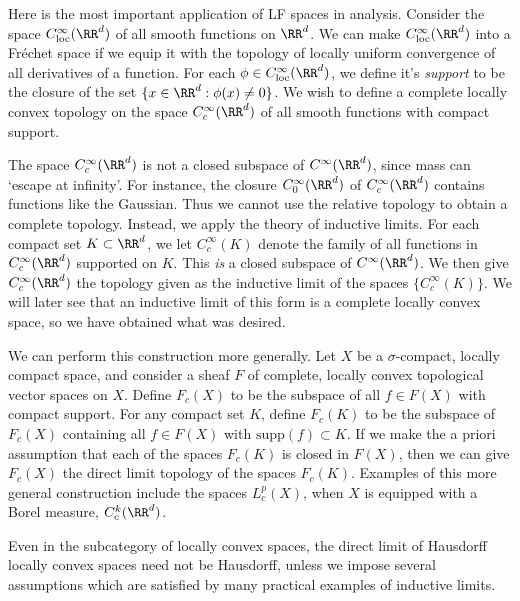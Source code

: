 \begin{example}
    Here is the most important application of LF spaces in analysis. Consider the space $C^\infty_{\text{loc}}(\RR^d)$ of all smooth functions on $\RR^d$. We can make $C^\infty_{\text{loc}}(\RR^d)$ into a Fr\'{e}chet space if we equip it with the topology of locally uniform convergence of all derivatives of a function. For each $\phi \in C^\infty_{\text{loc}}(\RR^d)$, we define it's \emph{support} to be the closure of the set $\{ x \in \RR^d: \phi(x) \neq 0 \}$. We wish to define a complete locally convex topology on the space $C_c^\infty(\RR^d)$ of all smooth functions with compact support.

    The space $C_c^\infty(\RR^d)$ is not a closed subspace of $C^\infty(\RR^d)$, since mass can `escape at infinity'. For instance, the closure $C_0^\infty(\RR^d)$ of $C_c^\infty(\RR^d)$ contains functions like the Gaussian. Thus we cannot use the relative topology to obtain a complete topology. Instead, we apply the theory of inductive limits. For each compact set $K \subset \RR^d$, we let $C_c^\infty(K)$ denote the family of all functions in $C_c^\infty(\RR^d)$ supported on $K$. This \emph{is} a closed subspace of $C^\infty(\RR^d)$. We then give $C_c^\infty(\RR^d)$ the topology given as the inductive limit of the spaces $\{ C_c^\infty(K) \}$. We will later see that an inductive limit of this form is a complete locally convex space, so we have obtained what was desired.

    We can perform this construction more generally. Let $X$ be a $\sigma$-compact, locally compact space, and consider a sheaf $F$ of complete, locally convex topological vector spaces on $X$. Define $F_c(X)$ to be the subspace of all $f \in F(X)$ with compact support. For any compact set $K$, define $F_c(K)$ to be the subspace of $F_c(X)$ containing all $f \in F(X)$ with $\text{supp}(f) \subset K$. If we make the a priori assumption that each of the spaces $F_c(K)$ is closed in $F(X)$, then we can give $F_c(X)$ the direct limit topology of the spaces $F_c(K)$. Examples of this more general construction include the spaces $L^p_c(X)$, when $X$ is equipped with a Borel measure, $C^k_c(\RR^d)$.
\end{example}

Even in the subcategory of locally convex spaces, the direct limit of Hausdorff locally convex spaces need not be Hausdorff, unless we impose several assumptions which are satisfied by many practical examples of inductive limits.

